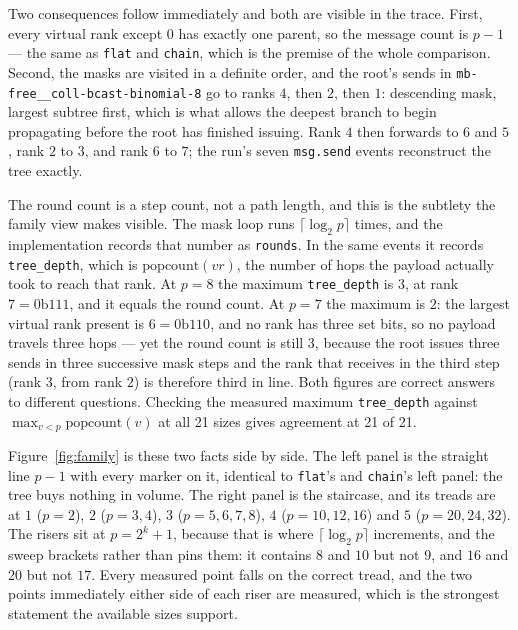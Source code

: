 \documentclass[11pt]{article}
\begin{document}
Two consequences follow immediately and both are visible in the trace. First, every virtual
rank except $0$ has exactly one parent, so the message count is $p-1$ --- the same as
\texttt{flat} and \texttt{chain}, which is the premise of the whole comparison. Second, the
masks are visited in a definite order, and the root's sends in
\texttt{mb-free\_\_coll-bcast-binomial-8} go to ranks $4$, then $2$, then $1$: descending
mask, largest subtree first, which is what allows the deepest branch to begin propagating
before the root has finished issuing. Rank $4$ then forwards to $6$ and $5$, rank $2$ to $3$,
and rank $6$ to $7$; the run's seven \texttt{msg.send} events reconstruct the tree exactly.

The round count is a step count, not a path length, and this is the subtlety the family view
makes visible. The mask loop runs $\lceil\log_2 p\rceil$ times, and the implementation records
that number as \texttt{rounds}. In the same events it records \texttt{tree\_depth}, which is
$\mathrm{popcount}(vr)$, the number of hops the payload actually took to reach that rank. At
$p=8$ the maximum \texttt{tree\_depth} is $3$, at rank $7 = 0\mathrm{b}111$, and it equals
the round count. At $p=7$ the maximum is $2$: the largest virtual rank present is
$6 = 0\mathrm{b}110$, and no rank has three set bits, so no payload travels three hops --- yet
the round count is still $3$, because the root issues three sends in three successive mask
steps and the rank that receives in the third step (rank $3$, from rank $2$) is therefore
third in line. Both figures are correct answers to different questions. Checking the measured
maximum \texttt{tree\_depth} against $\max_{v<p} \mathrm{popcount}(v)$ at all 21 sizes gives
agreement at 21 of 21.

Figure~\ref{fig:family} is these two facts side by side. The left panel is the straight line
$p-1$ with every marker on it, identical to \texttt{flat}'s and \texttt{chain}'s left panel:
the tree buys nothing in volume. The right panel is the staircase, and its treads are at
$1$ ($p=2$), $2$ ($p=3,4$), $3$ ($p=5,6,7,8$), $4$ ($p=10,12,16$) and $5$ ($p=20,24,32$). The
risers sit at $p = 2^k+1$, because that is where $\lceil\log_2 p\rceil$ increments, and the
sweep brackets rather than pins them: it contains $8$ and $10$ but not $9$, and $16$ and $20$
but not $17$. Every measured point falls on the correct tread, and the two points immediately
either side of each riser are measured, which is the strongest statement the available sizes
support.
\end{document}
